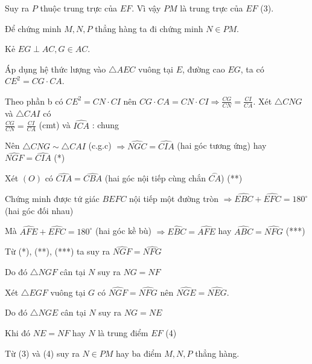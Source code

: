 \begin{ex}
{		Suy ra $P$ thuộc trung trực của $EF$. Vì vậy $PM$ là trung trực của $EF$ (3).
		
		Để chứng minh $M, N, P$ thẳng hàng ta đi chứng minh $N \in PM$.
		
		Kẻ $EG \perp AC, G \in AC$.
		
		Áp dụng hệ thức lượng vào $\triangle AEC$ vuông tại $E$, đường cao $EG$, ta có $CE^2 = CG \cdot CA$.
		
		Theo phần b có $CE^2 = CN \cdot CI$ nên $CG \cdot CA = CN \cdot CI \Rightarrow \frac{CG}{CN} = \frac{CI}{CA}$.
		Xét $\triangle CNG$ và $\triangle CAI$ có \\
		$\frac{CG}{CN} = \frac{CI}{CA}$ (cmt) và $\widehat{ICA}$ : chung
		
		Nên $\triangle CNG \sim \triangle CAI$ (c.g.c) $\Rightarrow \widehat{NGC} = \widehat{CIA}$ (hai góc tương ứng) hay $\widehat{NGF} = \widehat{CIA}$ (*)
		
		Xét $(O)$ có $\widehat{CIA} = \widehat{CBA}$ (hai góc nội tiếp cùng chắn $\stackrel{\frown}{CA}$) (**)
		
		Chứng minh được tứ giác $BEFC$ nội tiếp một đường tròn $\Rightarrow \widehat{EBC} + \widehat{EFC} = 180^\circ$ (hai góc đối nhau)
		
		Mà $\widehat{AFE} + \widehat{EFC} = 180^\circ$ (hai góc kề bù) $\Rightarrow \widehat{EBC} = \widehat{AFE}$ hay $\widehat{ABC} = \widehat{NFG}$ (***)
		
		Từ (*), (**), (***) ta suy ra $\widehat{NGF} = \widehat{NFG}$
		
		Do đó $\triangle NGF$ cân tại $N$ suy ra $NG = NF$
		
		Xét $\triangle EGF$ vuông tại $G$ có $\widehat{NGF} = \widehat{NFG}$ nên $\widehat{NGE} = \widehat{NEG}$.
		
		Do đó $\triangle NGE$ cân tại $N$ suy ra $NG = NE$
		
		Khi đó $NE = NF$ hay $N$ là trung điểm $EF$ (4)
		
		Từ (3) và (4) suy ra $N \in PM$ hay ba điểm $M,N,P$ thẳng hàng.
		}
		
		
\end{ex}
